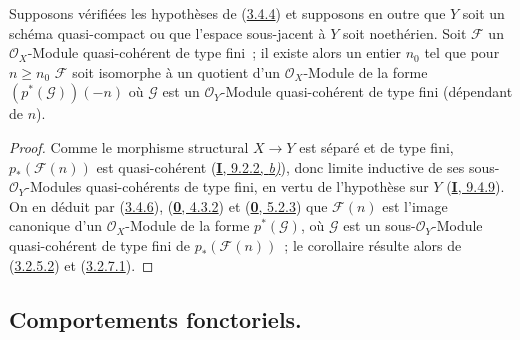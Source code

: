 \begin{corollary}[3.4.8]
\label{II.3.4.8-fr}
Supposons vérifiées les hypothèses de \textup{(\hyperref[II.3.4.4-fr]{3.4.4})} et
supposons en outre que $Y$ soit un schéma quasi-compact ou que l'espace
sous-jacent à $Y$ soit noethérien. Soit $\mathcal{F}$ un
$\mathcal{O}_X$-Module quasi-cohérent de type fini~; il existe alors un entier
$n_0$ tel que pour $n\geq n_0$ $\mathcal{F}$ soit isomorphe à un quotient
d'un $\mathcal{O}_X$-Module de la forme $(p^*(\mathcal{G}))(-n)$ où
$\mathcal{G}$ est un $\mathcal{O}_Y$-Module quasi-cohérent de type fini
(dépendant de $n$).
\end{corollary}

\begin{proof}
Comme le morphisme structural $X\to Y$ est séparé et de type fini,
$p_*(\mathcal{F}(n))$ est quasi-cohérent
(\hyperref[I.9.2.2-fr]{\textbf{I}, 9.2.2, \emph{b)}}), donc limite inductive de ses
sous-$\mathcal{O}_Y$-Modules quasi-cohérents de type fini, en vertu de
l'hypothèse sur $Y$ (\hyperref[I.9.4.9-fr]{\textbf{I}, 9.4.9}). On en déduit par
(\hyperref[II.3.4.6-fr]{3.4.6}),
(\hyperref[0.4.3.2-fr]{\textbf{0}, 4.3.2}) et
(\hyperref[0.5.2.3-fr]{\textbf{0}, 5.2.3}) que $\mathcal{F}(n)$ est l'image canonique
d'un $\mathcal{O}_X$-Module de la forme $p^*(\mathcal{G})$, où $\mathcal{G}$
est un sous-$\mathcal{O}_Y$-Module quasi-cohérent de type fini de
$p_*(\mathcal{F}(n))$~; le corollaire résulte alors de
(\hyperref[II.3.2.5.2-fr]{3.2.5.2}) et
(\hyperref[II.3.2.7.1-fr]{3.2.7.1}).
\end{proof}

\subsection{Comportements fonctoriels.}
\label{subsection:II.3.5-fr}

